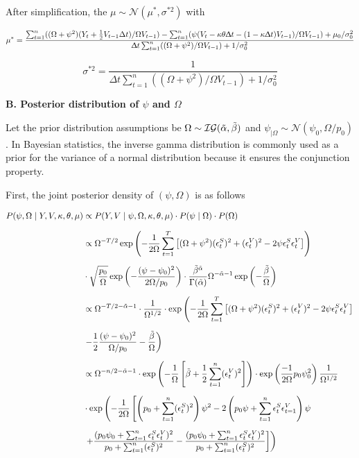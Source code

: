 \documentclass[12pt,a4paper]{article}
\numberwithin{equation}{section}
\begin{document}
After simplification, the $\mu \sim \mathcal{N}(\mu^*, \sigma^{*2})$ with

\[
\mu^* = \frac{\sum_{t=1}^n ((\Omega + \psi^2) (Y_t + \frac{1}{2} V_{t-1} \Delta t)/\Omega V_{t-1}) - \sum_{t=1}^n (\psi (V_t - \kappa \theta \Updelta t - (1 - \kappa \Updelta t)V_{t-1})/\Omega V_{t-1}) + \mu_0/\sigma_0^2}{\Updelta t \sum_{t=1}^n ((\Omega + \psi^2) / \Omega V_{t-1}) + 1 / \sigma_0^2}
\]

\[
\sigma^{*2} = \frac{1}{\Delta t \sum_{t=1}^n ((\Omega + \psi^2) / \Omega V_{t-1}) + 1 / \sigma_0^2}
\]

\vspace{1em}

\textbf{B. Posterior distribution of $\psi$ and $\Omega$}
\vspace{1em}

Let the prior distribution assumptions be $\Omega\sim \mathcal{IG}(\Tilde{\alpha}, \Tilde{\beta})$ and $\psi_{|\Omega} \sim \mathcal{N}(\psi_0, \Omega/p_0)$. In Bayesian statistics, the inverse gamma distribution is commonly used as a prior for the variance of a normal distribution because it ensures the conjunction property.

First, the joint posterior density of $(\psi,\Omega)$ is as follows

\begin{align*}
P(\psi, \Omega \mid Y, V, \kappa, \theta, \mu) &\propto P(Y, V \mid \psi, \Omega, \kappa, \theta, \mu) \cdot P(\psi \mid \Omega) \cdot P(\Omega) \\[0.6em]
& \propto \Omega^{-T/2} \exp\left( -\frac{1}{2\Omega} \sum_{t=1}^{T} \left[ (\Omega + \psi^2)(\epsilon_t^S)^2 + (\epsilon_t^V)^2 - 2\psi \epsilon_t^S \epsilon_t^V \right] \right) \\[0.6em]
& \cdot \sqrt{\frac{p_0}{\Omega}} \exp\left( -\frac{(\psi - \psi_0)^2}{2\Omega/p_0} \right) \cdot \frac{\tilde{\beta}^{\tilde{\alpha}}}{\Gamma(\tilde{\alpha})} \Omega^{-\tilde{\alpha}-1} \exp\left( -\frac{\tilde{\beta}}{\Omega} \right) \\[0.6em]
& \propto \Omega^{-T/2 - \tilde{\alpha} - 1} \cdot \frac{1}{\Omega^{1/2}} \cdot \exp\left( -\frac{1}{2\Omega} \sum_{t=1}^{T} \left[ (\Omega + \psi^2)(\epsilon_t^S)^2 + (\epsilon_t^V)^2 - 2\psi \epsilon_t^S \epsilon_t^V \right] \right. \\[0.6em]
& \left. - \frac{1}{2} \frac{(\psi - \psi_0)^2}{\Omega/p_0} - \frac{\tilde{\beta}}{\Omega} \right)\\[0.6em]
&\propto \Omega^{-n/2-\Tilde{\alpha}-1} \cdot \exp \left( -\frac{1}{\Omega} \left[\Tilde{\beta} + \frac{1}{2}\sum_{t=1}^n (\epsilon_t^V)^2\right]\right) \cdot \exp \left(\frac{-1}{2\Omega}p_0\psi_0^2\right)\frac{1}{\Omega^{1/2}}\\[0.6em]
&\cdot \exp \left( -\frac{1}{2 \Omega} \left[ \left( p_0 + \sum_{t=1}^n (\epsilon_t^S)^2 \right) \psi^2 -2 \left(p_0 \psi + \sum_{t=1}^n \epsilon_t^S \epsilon_{t=1}^V \right) \psi \right. \right.\\[0.6em]
&\left. \left. + \frac{(p_0 \psi_0 + \sum_{t=1}^n \epsilon_t^S \epsilon_t^V )^2 }{p_0 + \sum_{t=1}^n (\epsilon_t^S )^2 } - \frac{(p_0 \psi_0 + \sum_{t=1}^n \epsilon_t^S \epsilon_t^V )^2 }{p_0 + \sum_{t=1}^n (\epsilon_t^S )^2 }\right]\right)
\end{align*}
\end{document}
